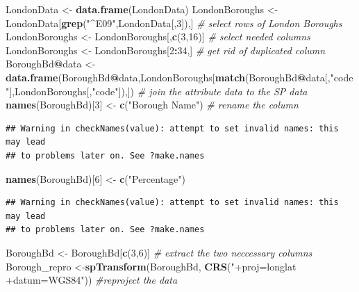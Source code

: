 \documentclass[]{article}
\newenvironment{Shaded}{\begin{snugshade}}{\end{snugshade}}
\newcommand{\KeywordTok}[1]{\textcolor[rgb]{0.13,0.29,0.53}{\textbf{#1}}}
\newcommand{\DecValTok}[1]{\textcolor[rgb]{0.00,0.00,0.81}{#1}}
\newcommand{\StringTok}[1]{\textcolor[rgb]{0.31,0.60,0.02}{#1}}
\newcommand{\CommentTok}[1]{\textcolor[rgb]{0.56,0.35,0.01}{\textit{#1}}}
\newcommand{\OperatorTok}[1]{\textcolor[rgb]{0.81,0.36,0.00}{\textbf{#1}}}
\newcommand{\NormalTok}[1]{#1}
\begin{document}
\begin{Shaded}
\begin{Highlighting}[]
\NormalTok{LondonData <-}\StringTok{ }\KeywordTok{data.frame}\NormalTok{(LondonData)}
\NormalTok{LondonBoroughs <-}\StringTok{ }\NormalTok{LondonData[}\KeywordTok{grep}\NormalTok{(}\StringTok{"^E09"}\NormalTok{,LondonData[,}\DecValTok{3}\NormalTok{]),] }\CommentTok{# select rows of London Boroughs}
\NormalTok{LondonBoroughs <-}\StringTok{ }\NormalTok{LondonBoroughs[,}\KeywordTok{c}\NormalTok{(}\DecValTok{3}\NormalTok{,}\DecValTok{16}\NormalTok{)] }\CommentTok{# select needed columns}
\NormalTok{LondonBoroughs <-}\StringTok{ }\NormalTok{LondonBoroughs[}\DecValTok{2}\OperatorTok{:}\DecValTok{34}\NormalTok{,] }\CommentTok{# get rid of duplicated column}
\NormalTok{BoroughBd}\OperatorTok{@}\NormalTok{data <-}\StringTok{ }\KeywordTok{data.frame}\NormalTok{(BoroughBd}\OperatorTok{@}\NormalTok{data,LondonBoroughs[}\KeywordTok{match}\NormalTok{(BoroughBd}\OperatorTok{@}\NormalTok{data[,}\StringTok{"code"}\NormalTok{],LondonBoroughs[,}\StringTok{"code"}\NormalTok{]),]) }\CommentTok{# join the attribute data to the SP data}
\KeywordTok{names}\NormalTok{(BoroughBd)[}\DecValTok{3}\NormalTok{] <-}\StringTok{ }\KeywordTok{c}\NormalTok{(}\StringTok{"Borough Name"}\NormalTok{) }\CommentTok{# rename the column}
\end{Highlighting}
\end{Shaded}

\begin{verbatim}
## Warning in checkNames(value): attempt to set invalid names: this may lead
## to problems later on. See ?make.names
\end{verbatim}

\begin{Shaded}
\begin{Highlighting}[]
\KeywordTok{names}\NormalTok{(BoroughBd)[}\DecValTok{6}\NormalTok{] <-}\StringTok{ }\KeywordTok{c}\NormalTok{(}\StringTok{"Percentage"}\NormalTok{)}
\end{Highlighting}
\end{Shaded}

\begin{verbatim}
## Warning in checkNames(value): attempt to set invalid names: this may lead
## to problems later on. See ?make.names
\end{verbatim}

\begin{Shaded}
\begin{Highlighting}[]
\NormalTok{BoroughBd <-}\StringTok{ }\NormalTok{BoroughBd[}\KeywordTok{c}\NormalTok{(}\DecValTok{3}\NormalTok{,}\DecValTok{6}\NormalTok{)] }\CommentTok{# extract the two neccessary columns}
\NormalTok{Borough_repro <-}\KeywordTok{spTransform}\NormalTok{(BoroughBd, }\KeywordTok{CRS}\NormalTok{(}\StringTok{"+proj=longlat +datum=WGS84"}\NormalTok{)) }\CommentTok{#reproject the data}
\end{Highlighting}
\end{Shaded}
\end{document}
